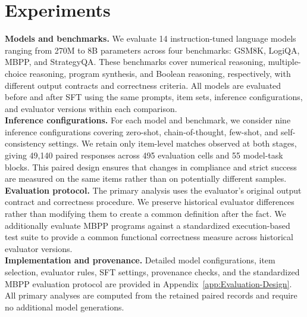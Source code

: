 \documentclass{article}
\begin{document}
\section{Experiments}
\vspace{-2mm}
\noindent\textbf{Models and benchmarks.}
We evaluate 14 instruction-tuned language models ranging from 270M to 8B parameters across four benchmarks: GSM8K, LogiQA, MBPP, and StrategyQA. These benchmarks cover numerical reasoning, multiple-choice reasoning, program synthesis, and Boolean reasoning, respectively, with different output contracts and correctness criteria. All models are evaluated before and after SFT using the same prompts, item sets, inference configurations, and evaluator versions within each comparison.
\\
\noindent\textbf{Inference configurations.}
For each model and benchmark, we consider nine inference configurations covering zero-shot, chain-of-thought, few-shot, and self-consistency settings. We retain only item-level matches observed at both stages, giving 49,140 paired responses across 495 evaluation cells and 55 model-task blocks. This paired design ensures that changes in compliance and strict success are measured on the same items rather than on potentially different samples.
\\
\noindent\textbf{Evaluation protocol.}
The primary analysis uses the evaluator's original output contract and correctness procedure. We preserve historical evaluator differences rather than modifying them to create a common definition after the fact. We additionally evaluate MBPP programs against a standardized execution-based test suite to provide a common functional correctness measure across historical evaluator versions.
\\
\noindent\textbf{Implementation and provenance.}
Detailed model configurations, item selection, evaluator rules, SFT settings, provenance checks, and the standardized MBPP evaluation protocol are provided in Appendix~\ref{app:Evaluation-Design}. All primary analyses are computed from the retained paired records and require no additional model generations.
\end{document}

